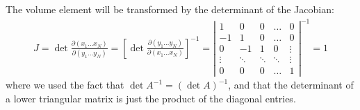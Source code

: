 \documentclass[../template.tex]{subfiles}
\begin{document}
The volume element will be transformed by the determinant of the Jacobian:
\begin{align*}
    J = \operatorname{det} \frac{\partial (x_1 \dots x_N)}{\partial(y_1 \dots y_N)} = \left[\operatorname{det} \frac{\partial (y_1 \dots y_N)}{\partial (x_1 \dots x_N)}  \right]^{-1} = \left|
    \begin{array}{ccccc}
    1 & 0 & 0 & \dots & 0 \\ 
    -1 & 1 & 0 & \dots & 0 \\ 
    0 & -1 & 1 & 0 & \vdots \\ 
    \vdots & \ddots & \ddots & \ddots & \vdots \\ 
    0 & 0 & 0 & \dots & 1
    \end{array}
    \right|^{-1} = 1
\end{align*}
where we used the fact that $\operatorname{det}A^{-1} = (\operatorname{det}A)^{-1}$, and that the determinant of a lower triangular matrix is just the product of the diagonal entries.
\end{document}
